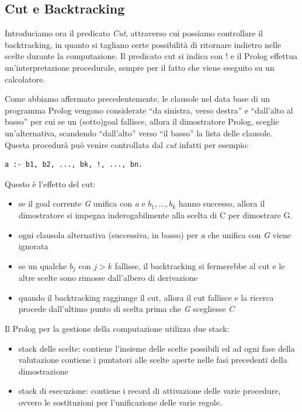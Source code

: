 \documentclass[a4paper]{book}
\begin{document}
\subsection{Cut e Backtracking}
Introduciamo ora il predicato \emph{Cut}, attraverso cui possiamo controllare il backtracking, in quanto si tagliano certe possibilità
di ritornare indietro nelle scelte durante la computazione.\newline
Il predicato cut si indica con $!$ e il Prolog effettua un'interpretazione procedurale, sempre per il fatto che viene eseguito su un calcolatore.

Come abbiamo affermato precedentemente, le clausole nel data base di un programma Prolog vengono considerate “da sinistra, verso destra”
e “dall'alto al basso” per cui se un (sotto)goal fallisce, allora il dimostratore Prolog, sceglie un'alternativa,
scandendo “dall'alto” verso “il basso” la lista delle clausole.\newline
Questa procedurà può venire controllata dal \textit{cut} infatti per esempio:
\begin{verbatim}
a :- b1, b2, ..., bk, !, ..., bn.
\end{verbatim}
Questo è l'effetto del cut:
\begin{itemize}
\item se il goal corrente \textit{G} unifica con \textit{a} e $b_1,...,b_k$ hanno successo,
      allora il dimostratore si impegna inderogabilmente alla scelta di C per dimostrare G.
\item ogni clausola alternativa (successiva, in basso) per \textit{a} che unifica con \textit{G} viene ignorata
\item se un qualche $b_j$ con $j > k$ fallisse, il backtracking si fermerebbe al cut e le altre scelte sono rimosse dall'albero di derivazione
\item quando il backtracking raggiunge il cut, allora il cut fallisce e la ricerca procede dall’ultimo punto di scelta
      prima che \textit{G} scegliesse \textit{C}
\end{itemize}
Il Prolog per la gestione della computazione utilizza due stack:
\begin{itemize}
\item stack delle scelte: contiene l'insieme delle scelte possibili ed ad ogni fase della valutazione contiene i puntatori alle
      scelte aperte nelle fasi precedenti della dimostrazione
\item stack di esecuzione: contiene i record di attivazione delle varie procedure, ovvero le sostituzioni per l'unificazione delle varie regole.
\end{itemize}
\end{document}
